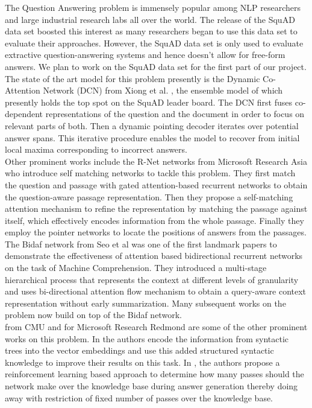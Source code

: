 The Question Answering problem is immensely popular among NLP researchers and large industrial research labs all over the world. The release of the SquAD data set \cite{squad} boosted this interest as many researchers began to use this data set to evaluate their approaches. However, the SquAD data set is only used to evaluate extractive question-answering systems and hence doesn't allow for free-form answers. We plan to work on the SquAD data set for the first part of our project.\\
The state of the art model for this problem presently is the Dynamic Co-Attention Network (DCN) from Xiong et al.  \cite{DCN}, the ensemble model of which presently holds the top spot on the SquAD leader board. The DCN first fuses co-dependent representations of the question and the document in order to focus on relevant parts of both. Then a dynamic pointing decoder iterates over potential answer spans. This iterative procedure enables the model to recover from initial local maxima corresponding to incorrect answers.\\
Other prominent works include the R-Net networks from Microsoft Research Asia \cite{Rnet} who introduce self matching networks to tackle this problem. They first match the question and passage with gated attention-based recurrent networks to obtain the question-aware passage representation. Then they propose a self-matching attention mechanism to refine the representation by matching the passage against itself, which effectively encodes information from the whole passage. Finally they employ the pointer networks to locate the positions of answers from the passages.\\
The Bidaf network from Seo et al \cite{bidaf} was one of the first landmark papers to demonstrate the effectiveness of attention based bidirectional recurrent networks on the task of Machine Comprehension.  They introduced a multi-stage hierarchical process that represents the context at different levels of granularity and uses bi-directional attention flow mechanism to obtain a query-aware context representation without early summarization. Many subsequent works on the problem now build on top of the Bidaf network.\\
\cite{Sedt} from CMU and \cite{Reasonet} for Microsoft Research Redmond are some of the other prominent works on this problem. In \cite{Sedt} the authors encode the information from syntactic trees into the vector embeddings and use this added structured syntactic knowledge to improve their results on this task. In \cite{Reasonet}, the authors propose a reinforcement learning based approach to determine how many passes should the network make over the knowledge base during answer generation thereby doing away with restriction of fixed number of passes over the knowledge base.\\

